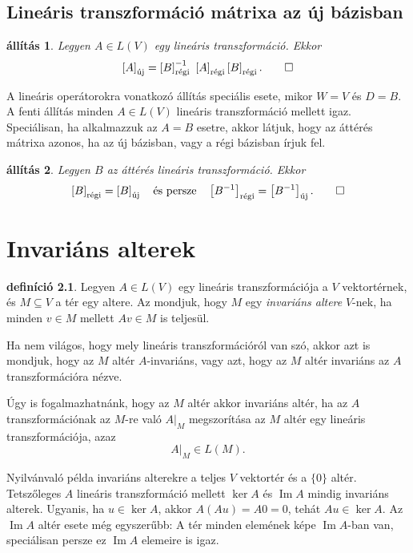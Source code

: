 \documentclass[9pt, a4paper, showtrims]{memoir}
\makeatletter
\renewenvironment{proof}[1][\proofname]
    {\par\pushQED{\qed}%
    \normalfont \topsep6\p@\@plus6\p@\relax
    \trivlist
    \item[\hskip\labelsep
        \itshape
    #1\@addpunct{:}]\ignorespaces}
    {\popQED\endtrivlist\@endpefalse}
\theoremstyle{plain}
\newtheorem{proposition}{állítás}[chapter]
\theoremstyle{remark}
\theoremstyle{definition}
\newtheorem{definition}[proposition]{definíció}
\DeclareMathOperator{\im}{Im}
\newcommand{\uj}{\text{új}}
\newcommand{\rgi}{\text{régi}}
\makeatother
\begin{document}
\section{Lineáris transzformáció mátrixa az új bázisban}
\begin{proposition}
	Legyen $A\in L\left( V \right)$ egy lineáris transzformáció.
	Ekkor
	\[
		\left[ A \right]_{\uj}
		=
		\left[ B \right]^{-1}_\rgi\
		\left[ A \right]_\rgi
		\left[ B \right]_\rgi.\qedhere
	\]
\end{proposition}
\begin{proof}
	A lineáris operátorokra vonatkozó állítás speciális esete,
	mikor $W=V$ és $D=B$.
\end{proof}
A fenti állítás minden $A\in L\left( V \right)$ lineáris transzformáció mellett igaz.
Speciálisan, ha alkalmazzuk az $A=B$ esetre, akkor látjuk,
hogy az áttérés mátrixa azonos, ha az új bázisban, vagy a régi bázisban írjuk fel.
\begin{proposition}
	Legyen $B$ az áttérés lineáris transzformáció.
	Ekkor
	\[
		\left[ B \right]_\rgi=\left[ B \right]_\uj
		\quad\text{és persze}\quad
		\left[ B^{-1} \right]_\rgi=\left[ B^{-1} \right]_\uj.\qedhere
	\]
\end{proposition}

\chapter{Invariáns alterek}
\begin{definition}
	Legyen $A\in L\left( V \right)$ egy lineáris transzformációja a $V$ vektortérnek,
	és $M\subseteq V$ a tér egy altere.
	Az mondjuk, hogy $M$ egy \emph{invariáns altere}
	$V$-nek, ha minden $v\in M$ mellett $Av\in M$ is teljesül.
\end{definition}
Ha nem világos, hogy mely lineáris transzformációról van szó,
akkor azt is mondjuk, hogy az $M$ altér $A$-invariáns, vagy azt,
hogy az $M$ altér invariáns az $A$ transzformációra nézve.

Úgy is fogalmazhatnánk, hogy az $M$ altér akkor invariáns altér,
ha az $A$ transzformációnak az $M$-re való $A|_M$ megszorítása az $M$
altér egy lineáris transzformációja, azaz
\[
	A|_M\in L\left( M \right).
\]

Nyilvánvaló példa invariáns alterekre a teljes $V$ vektortér és a $\{0\}$ altér.
Tetszőleges $A$ lineáris transzformáció mellett $\ker A$ és $\im A$ mindig invariáns alterek.
Ugyanis, ha $u\in\ker A$, akkor $A\left( Au \right)=A0=0$, tehát $Au\in\ker A$.
Az $\im A$ altér esete még egyszerűbb: A tér minden elemének képe $\im A$-ban van, speciálisan persze ez $\im A$ elemeire is igaz.
\end{document}
